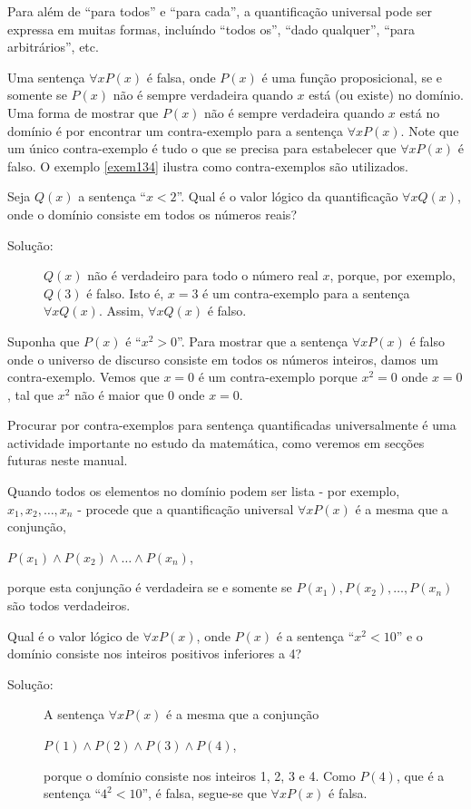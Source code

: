 Para além de ``para todos'' e ``para cada'', a quantificação universal pode ser
expressa em muitas formas, incluíndo ``todos os'', ``dado qualquer'', ``para
arbitrários'', etc.

Uma sentença $\forall xP(x)$ é falsa, onde $P(x)$ é uma função proposicional, se
e somente se $P(x)$ não é sempre verdadeira quando $x$ está (ou existe) no
domínio. Uma forma de mostrar que $P(x)$ não é sempre verdadeira quando $x$ está
no domínio é por encontrar um contra-exemplo para a sentença $\forall xP(x)$.
Note que um único contra-exemplo é tudo o que se precisa para estabelecer que
$\forall xP(x)$ é falso. O exemplo \ref{exem134} ilustra como contra-exemplos
são utilizados.

\begin{exmp}
\label{exem134}
Seja $Q(x)$ a sentença ``$x < 2$''. Qual é o valor lógico da quantificação
$\forall xQ(x)$, onde o domínio consiste em todos os números reais?
\end{exmp}
\begin{description}
\item[Solução:] $Q(x)$ não é verdadeiro para todo o número real $x$, porque, por
exemplo, $Q(3)$ é falso. Isto é, $x=3$ é um contra-exemplo para a sentença
$\forall xQ(x)$. Assim, $\forall xQ(x)$ é falso.
\end{description}

\begin{exmp}
\label{exem135}
Suponha que $P(x)$ é ``$x^2 > 0$''. Para mostrar que a sentença $\forall xP(x)$
é falso onde o universo de discurso consiste em todos os números inteiros, damos
um contra-exemplo. Vemos que $x = 0$ é um contra-exemplo porque $x^2 = 0$ onde
$x = 0$, tal que $x^2$ não é maior que $0$ onde $x=0$.
\end{exmp}

Procurar por contra-exemplos para sentença quantificadas universalmente é uma
actividade importante no estudo da matemática, como veremos em secções futuras
neste manual.

Quando todos os elementos no domínio podem ser lista - por exemplo, $x_1, x_2,
\ldots, x_n$ - procede que a quantificação universal $\forall xP(x)$ é a mesma
que a conjunção,
\begin{center}
$P(x_1) \land P(x_2) \land \ldots \land P(x_n)$,
\end{center}
porque esta conjunção é verdadeira se e somente se $P(x_1),P(x_2),\ldots,P(x_n)$
são todos verdadeiros.

\begin{exmp}
\label{exem136}
Qual é o valor lógico de $\forall xP(x)$, onde $P(x)$ é a sentença ``$x^2 <
10$'' e o domínio consiste nos inteiros positivos inferiores a 4?
\end{exmp}
\begin{description}
\item[Solução:] A sentença $\forall xP(x)$ é a mesma que a conjunção
\begin{center}$P(1) \land P(2) \land P(3) \land P(4)$,\end{center}
porque o domínio consiste nos inteiros 1, 2, 3 e 4. Como $P(4)$, que é a
sentença ``$4^2 < 10$'', é falsa, segue-se que $\forall xP(x)$ é falsa.
\end{description}

